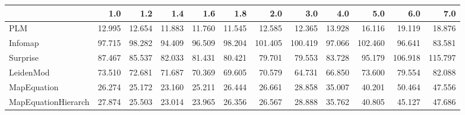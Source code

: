 \begin{tabular}{lrrrrrrrrrrr}
\toprule
{} &    1.0 &    1.2 &    1.4 &    1.6 &    1.8 &     2.0 &     3.0 &    4.0 &     5.0 &     6.0 &     7.0 \\
\midrule
PLM                 & 12.995 & 12.654 & 11.883 & 11.760 & 11.545 &  12.585 &  12.365 & 13.928 &  16.116 &  19.119 &  18.876 \\
Infomap             & 97.715 & 98.282 & 94.409 & 96.509 & 98.204 & 101.405 & 100.419 & 97.066 & 102.460 &  96.641 &  83.581 \\
Surprise            & 87.467 & 85.537 & 82.033 & 81.431 & 80.421 &  79.701 &  79.553 & 83.728 &  95.179 & 106.918 & 115.797 \\
LeidenMod           & 73.510 & 72.681 & 71.687 & 70.369 & 69.605 &  70.579 &  64.731 & 66.850 &  73.600 &  79.554 &  82.088 \\
MapEquation         & 26.274 & 25.172 & 23.160 & 25.211 & 26.444 &  26.661 &  28.858 & 35.007 &  40.201 &  50.464 &  47.556 \\
MapEquationHierarch & 27.874 & 25.503 & 23.014 & 23.965 & 26.356 &  26.567 &  28.888 & 35.762 &  40.805 &  45.127 &  47.686 \\
\bottomrule
\end{tabular}
